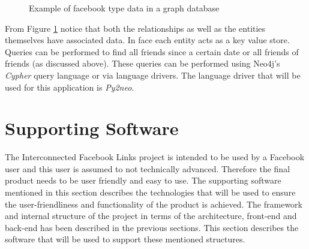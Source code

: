 \documentclass[10pt,onecolumn]{article}
\begin{document}
\begin{figure}[htbp]
    \centering
    \caption{Example of facebook type data in a graph database}
    \label{friends}
\end{figure}
From Figure \ref{friends} notice that both the relationships as well as the entities themselves have associated data. In face each entity acts as a key value store. Queries can be performed to find all friends since a certain date or all friends of friends (as discussed above). These queries can be performed using Neo4j's \emph{Cypher} query language or via language drivers. The language driver that will be used for this application is \emph{Py2neo}.

\section{Supporting Software}
The Interconnected Facebook Links project is intended to be used by a Facebook user and this user is assumed to not technically advanced. Therefore the final product needs to be user friendly and easy to use. The supporting software mentioned in this section describes the technologies that will be used to ensure the user-friendliness and functionality of the product is achieved. The framework and internal structure  of the project in terms of the architecture, front-end and back-end has been described in the previous sections. This section describes the software that will be used to support these mentioned structures.
\end{document}
